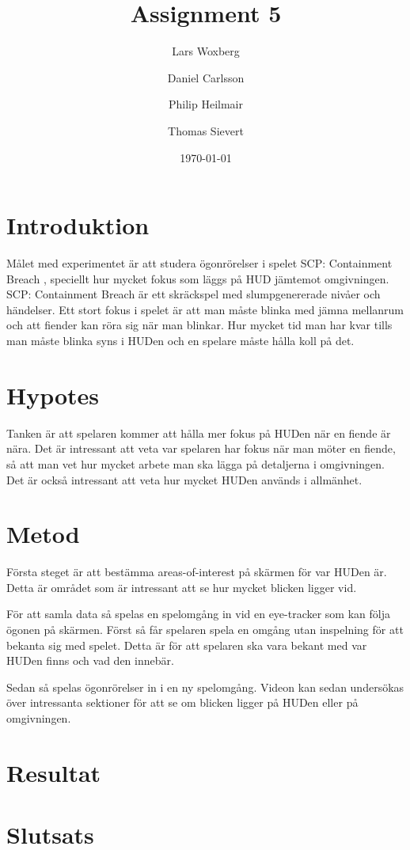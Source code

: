 \documentclass{article}
\author{Lars Woxberg \and Daniel Carlsson \and Philip Heilmair \and Thomas Sievert}
\date{\today}
\title{Assignment 5}
\begin{document}
\maketitle


\section{Introduktion}
Målet med experimentet är att studera ögonrörelser i spelet SCP: Containment Breach \cite{SCP}, speciellt hur mycket fokus som läggs på HUD jämtemot omgivningen. SCP: Containment Breach är ett skräckspel med slumpgenererade nivåer och händelser. Ett stort fokus i spelet är att man måste blinka med jämna mellanrum och att fiender kan röra sig när man blinkar. Hur mycket tid man har kvar tills man måste blinka syns i HUDen och en spelare måste hålla koll på det.

\section{Hypotes}
Tanken är att spelaren kommer att hålla mer fokus på HUDen när en fiende är nära. Det är intressant att veta var spelaren har fokus när man möter en fiende, så att man vet hur mycket arbete man ska lägga på detaljerna i omgivningen. Det är också intressant att veta hur mycket HUDen används i allmänhet.

\section{Metod}
Första steget är att bestämma areas-of-interest på skärmen för var HUDen är. Detta är området som är intressant att se hur mycket blicken ligger vid.

För att samla data så spelas en spelomgång in vid en eye-tracker som kan följa ögonen på skärmen. Först så får spelaren spela en omgång utan inspelning för att bekanta sig med spelet. Detta är för att spelaren ska vara bekant med var HUDen finns och vad den innebär. 

Sedan så spelas ögonrörelser in i en ny spelomgång. Videon kan sedan undersökas över intressanta sektioner för att se om blicken ligger på HUDen eller på omgivningen.

\section{Resultat}

\section{Slutsats}



\end{document}
